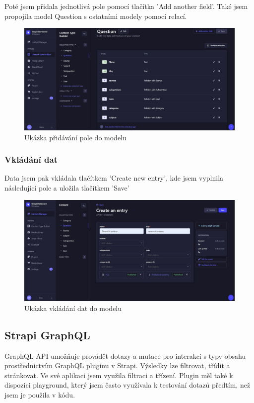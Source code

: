 \documentclass[12pt, a4paper,
oneside,      %
openright
]{report}
\begin{document}
Poté jsem přidala jednotlivá pole pomocí tlačítka 'Add another field'. Také jsem propojila model Question s ostatními modely pomocí relací.

\vspace{10pt}

\begin{figure}[h]
	\centering
	\includegraphics[width=0.8\linewidth]{image/strapi-question.jpg} 
	\caption{Ukázka přidávání pole do modelu}
\end{figure}

\subsubsection{Vkládání dat}
Data jsem pak vkládala tlačítkem 'Create new entry', kde jsem vyplnila následující pole a uložila tlačítkem 'Save'

\vspace{10pt}

\begin{figure}[h]
	\centering
	\includegraphics[width=0.8\linewidth]{image/new-entry.jpg} 
	\caption{Ukázka vkládání dat do modelu}
	\end{figure}

\subsection{Strapi GraphQL}
GraphQL API umožňuje provádět dotazy a mutace pro interakci s typy obsahu prostřednictvím GraphQL pluginu v Strapi. Výsledky lze filtrovat, třídit a stránkovat. Ve své aplikaci jsem využila filtraci a třízení. Plugin měl také k dispozici playground, který jsem často využívala k testování dotazů předtím, než jsem je použila v kódu.
\end{document}
